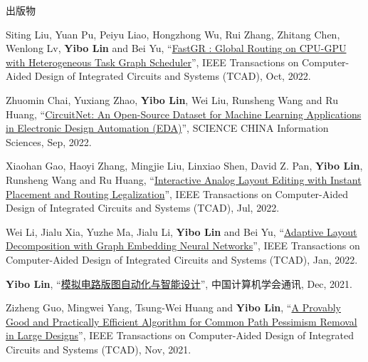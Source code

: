 \begin{rSection}{出版物}
\begin{description}[font=\normalfont, rightmargin=2em]
{}
            

\item[{[J38]}]{
        Siting Liu, Yuan Pu, Peiyu Liao, Hongzhong Wu, Rui Zhang, Zhitang Chen, Wenlong Lv, \textbf{Yibo Lin} and Bei Yu, 
    ``\href{https://doi.org/10.1109/TCAD.2022.3217668}{FastGR : Global Routing on CPU-GPU with Heterogeneous Task Graph Scheduler}'', 
    IEEE Transactions on Computer-Aided Design of Integrated Circuits and Systems (TCAD), Oct, 2022.
    
}
            

\item[{[J37]}]{
        Zhuomin Chai, Yuxiang Zhao, \textbf{Yibo Lin}, Wei Liu, Runsheng Wang and Ru Huang, 
    ``\href{https://www.sciengine.com/SCIS/doi/10.1007/s11432-022-3571-8}{CircuitNet: An Open-Source Dataset for Machine Learning Applications in Electronic Design Automation (EDA)}'', 
    SCIENCE CHINA Information Sciences, Sep, 2022.
    
}
            

\item[{[J36]}]{
        Xiaohan Gao, Haoyi Zhang, Mingjie Liu, Linxiao Shen, David Z. Pan, \textbf{Yibo Lin}, Runsheng Wang and Ru Huang, 
    ``\href{https://doi.org/10.1109/TCAD.2022.3190234}{Interactive Analog Layout Editing with Instant Placement and Routing Legalization}'', 
    IEEE Transactions on Computer-Aided Design of Integrated Circuits and Systems (TCAD), Jul, 2022.
    
}
            

\item[{[J35]}]{
        Wei Li, Jialu Xia, Yuzhe Ma, Jialu Li, \textbf{Yibo Lin} and Bei Yu, 
    ``\href{https://doi.org/10.1109/TCAD.2022.3140729}{Adaptive Layout Decomposition with Graph Embedding Neural Networks}'', 
    IEEE Transactions on Computer-Aided Design of Integrated Circuits and Systems (TCAD), Jan, 2022.
    
}
            

\item[{[J34]}]{
        \textbf{Yibo Lin}, 
    ``\href{https://dl.ccf.org.cn/article/articleDetail.html?type=xhtx_thesis&_ack=1&id=5743150191429632}{模拟电路版图自动化与智能设计}'', 
    中国计算机学会通讯, Dec, 2021.
    
}
            

\item[{[J33]}]{
        Zizheng Guo, Mingwei Yang, Tsung-Wei Huang and \textbf{Yibo Lin}, 
    ``\href{https://doi.org/10.1109/TCAD.2021.3124758}{A Provably Good and Practically Efficient Algorithm for Common Path Pessimism Removal in Large Designs}'', 
    IEEE Transactions on Computer-Aided Design of Integrated Circuits and Systems (TCAD), Nov, 2021.
    
}
\end{description}
\end{rSection}
